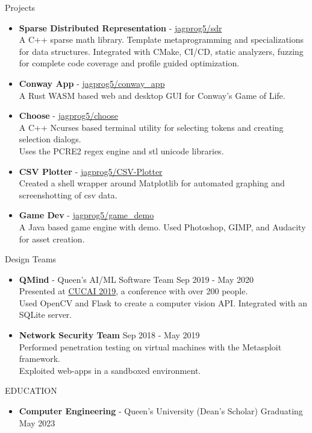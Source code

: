 \documentclass{resume} %
\begin{document}
\begin{rSection}{Projects}
    \begin{itemize}
        \item {\bf Sparse Distributed Representation} - \href{https://github.com/jagprog5/SDR/}{jagprog5/sdr}\\
        A C++ sparse math library. Template metaprogramming and specializations for data structures. Integrated with CMake, CI/CD, static analyzers, fuzzing for complete code coverage and profile guided optimization.
        \item {\bf Conway App} - \href{https://github.com/jagprog5/conway_app/}{jagprog5/conway\_app}\\
        A Rust WASM based web and desktop GUI for Conway's Game of Life.
        \item {\bf Choose} - \href{https://github.com/jagprog5/choose/}{jagprog5/choose}\\
        A C++ Ncurses based terminal utility for selecting tokens and creating selection dialogs.\\
        Uses the PCRE2 regex engine and stl unicode libraries.
        \item {\bf CSV Plotter} - \href{https://github.com/jagprog5/CSV-Plotter}{jagprog5/CSV-Plotter}\\
        Created a shell wrapper around Matplotlib for automated graphing and screenshotting of csv data. 
        \item {\bf Game Dev} - \href{https://github.com/jagprog5/GameDemo}{jagprog5/game\_demo}\\
        A Java based game engine with demo. Used Photoshop, GIMP, and Audacity for asset creation.
    \end{itemize}
\end{rSection}

\begin{rSection}{Design Teams}
    \begin{itemize}
        \item {\bf QMind} - Queen's AI/ML Software Team \hfill {Sep 2019 - May 2020}\\
        Presented at \href{https://medium.com/qmind-ai/cucai2019-c9d5f848f5c}{CUCAI 2019}, a conference with over 200 people.\\
        Used OpenCV and Flask to create a computer vision API.
        Integrated with an SQLite server.
        \item {\bf Network Security Team} \hfill {Sep 2018 - May 2019}\\
        Performed penetration testing on virtual machines with the Metasploit framework.\\
        Exploited web-apps in a sandboxed environment.
\end{itemize}
\end{rSection}

\begin{rSection}{EDUCATION}
    \begin{itemize}
        \item {\bf Computer Engineering} - Queen's University (Dean's Scholar) \hfill {Graduating May 2023}
    \end{itemize}
\end{rSection}
\end{document}
